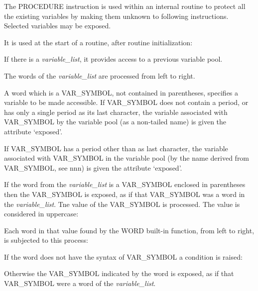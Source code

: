 The PROCEDURE instruction is used within an internal routine to protect
all the existing variables by making them unknown to following
instructions. Selected variables may be exposed.

It is used at the start of a routine, after routine initialization:



If there is a \emph{variable\_list}, it provides access to a previous
variable pool.

The words of the \emph{variable\_list} are processed from left to right.

A word which is a VAR\_SYMBOL, not contained in parentheses, specifies a
variable to be made accessible. If VAR\_SYMBOL does not contain a
period, or has only a single period as its last character, the variable
associated with VAR\_SYMBOL by the variable pool (as a non-tailed name)
is given the attribute `exposed'.



If VAR\_SYMBOL has a period other than as last character, the variable
associated with VAR\_SYMBOL in the variable pool (by the name derived
from VAR\_SYMBOL, see nnn) is given the attribute `exposed'.



If the word from the \emph{variable\_list} is a VAR\_SYMBOL enclosed in
parentheses then the VAR\_SYMBOL is exposed, as if that VAR\_SYMBOL was
a word in the \emph{variable\_list}. Tne value of the VAR\_SYMBOL is
processed. The value is considered in uppercase:



Each word in that value found by the WORD built-in function, from left
to right, is subjected to this process:

If the word does not have the syntax of VAR\_SYMBOL a condition is
raised:



Otherwise the VAR\_SYMBOL indicated by the word is exposed, as if that
VAR\_SYMBOL were a word of the \emph{variable\_list}.

